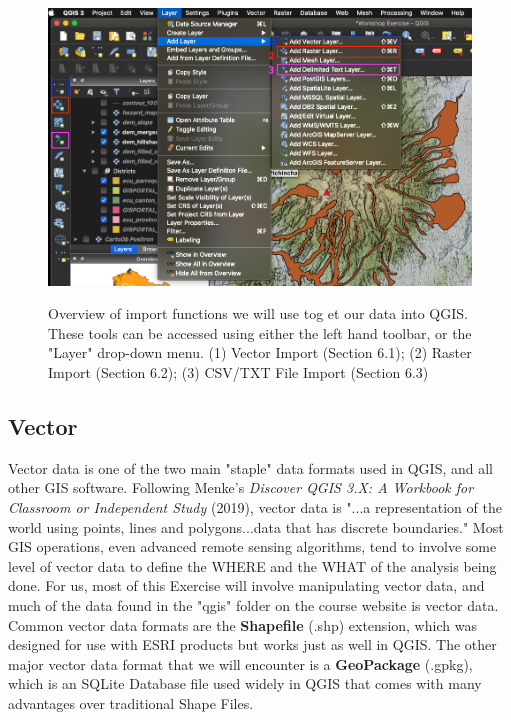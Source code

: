 \documentclass{article}
\begin{document}
\begin{figure}[htbp]
    \centering
    \includegraphics[width=\textwidth]{Fig_9_Import_Menus.png}
    \label{fig9}
    \caption{Overview of import functions we will use tog et our data into QGIS. These tools can be accessed using either the left hand toolbar, or the "Layer" drop-down menu. (1) Vector Import (Section 6.1); (2) Raster Import (Section 6.2); (3) CSV/TXT File Import (Section 6.3)}
\end{figure}

\subsection{Vector}

Vector data is one of the two main "staple" data formats used in QGIS, and all other GIS software. Following Menke's \textit{Discover QGIS 3.X: A Workbook for Classroom or Independent Study} (2019), vector data is "...a representation of the world using points, lines and polygons...data that has discrete boundaries." Most GIS operations, even advanced remote sensing algorithms, tend to involve some level of vector data to define the WHERE and the WHAT of the analysis being done. For us, most of this Exercise will involve manipulating vector data, and much of the data found in the "qgis" folder on the course website is vector data. Common vector data formats are the \textbf{Shapefile} (.shp) extension, which was designed for use with ESRI products but works just as well in QGIS. The other major vector data format that we will encounter is a \textbf{GeoPackage} (.gpkg), which is an SQLite Database file used widely in QGIS that comes with many advantages over traditional Shape Files. 
\end{document}
